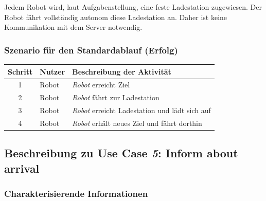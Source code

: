 			Jedem Robot wird, laut Aufgabenstellung, eine feste Ladestation zugewiesen. Der Robot fährt vollständig autonom diese Ladestation an. Daher ist keine Kommunikation mit dem Server notwendig.

			\subsubsection*{Szenario für den Standardablauf (Erfolg)}

			\begin{table}[H]
				\centering
				\begin{tabularx}{\textwidth}{|c|p{2cm}|X|}
				\hline
				Schritt & Nutzer & Beschreibung der Aktivität \\ \hline
				1 & Robot & \emph{Robot} erreicht Ziel \\
				2 & Robot & \emph{Robot} fährt zur Ladestation \\
				3 & Robot & \emph{Robot} erreicht Ladestation und lädt sich auf \\
				4 & Robot & \emph{Robot} erhält neues Ziel und fährt dorthin \\
				\hline
				\end{tabularx}
			\end{table}

			
		\pagebreak
		
			\subsection{Beschreibung zu Use Case \emph{5}: Inform about arrival}

			\subsubsection*{Charakterisierende Informationen}

